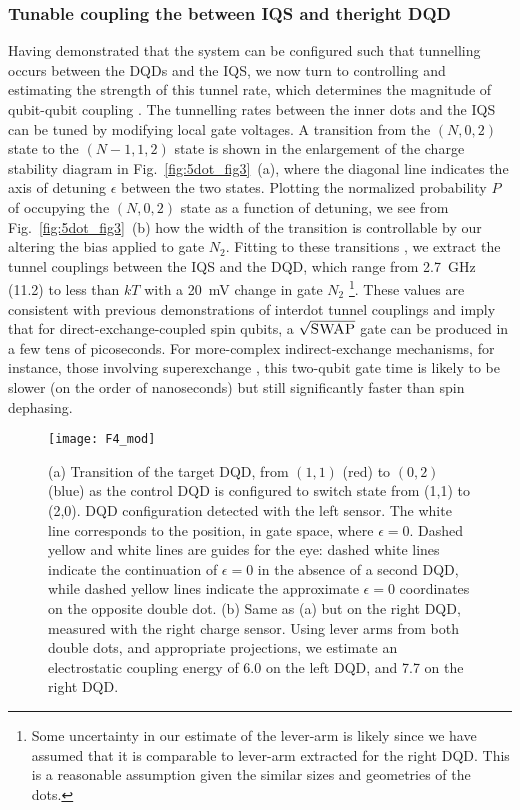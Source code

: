 \subsubsection{Tunable coupling the between IQS and theright DQD}
Having demonstrated that the system can be configured such that tunnelling occurs between the DQDs and the IQS, we now turn to controlling and estimating the strength of this tunnel rate, which determines the magnitude of qubit-qubit coupling \cite{bluhm,superexchange,srinivasa}. The tunnelling rates between the inner dots and the IQS can be tuned by modifying local gate voltages. A transition from the $(N,0,2)$ state to the $(N-1,1,2)$ state is shown in the enlargement of the charge stability diagram in Fig.~\ref{fig:5dot_fig3}~(a), where the diagonal line indicates the axis of detuning $\epsilon$ between the two states. Plotting the normalized probability $P$ of occupying the $(N,0,2)$ state as a function of detuning, we see from Fig.~\ref{fig:5dot_fig3}~(b) how the width of the transition is controllable by our altering the bias applied to gate $N_2$. Fitting to these transitions \cite{dicarlo}, we extract the tunnel couplings between the IQS and the DQD, which range from \SI{2.7}{\giga\hertz} (\SI{11.2}{\uev}) to less than $kT$ with a \SI{20}{\milli\volt} change in gate $N_2$ \footnote{Some uncertainty in our estimate of the lever-arm is likely since we have assumed that it is comparable to lever-arm extracted for the right DQD. This is a reasonable assumption given the similar sizes and geometries of the dots.}. These values are consistent with previous demonstrations of interdot tunnel couplings \cite{superexchange,petta} and imply that for direct-exchange-coupled spin qubits, a $\sqrt{\textsc{SWAP}}$ gate can be produced in a few tens of picoseconds. For more-complex indirect-exchange mechanisms, for instance, those involving superexchange \cite{bluhm,superexchange}, this two-qubit gate time is likely to be slower (on the order of nanoseconds) but still significantly faster than spin dephasing. 

\begin{figure}
\texttt{[image: F4\_mod]}
\caption[Capacative coupling between double quantum dots via an intermediate quantum state]{\label{fig:5dot_fig4} (a) Transition of the target DQD, from $(1,1)$ (red) to $(0,2)$ (blue) as the control DQD is configured to switch state from (1,1) to (2,0). DQD configuration detected with the left sensor. The white line corresponds to the position, in gate space, where $\epsilon = 0$. Dashed yellow and white lines are guides for the eye: dashed white lines indicate the continuation of $\epsilon = 0$ in the absence of a second DQD, while dashed yellow lines indicate the approximate $\epsilon = 0$ coordinates on the opposite double dot.  (b)  Same as (a) but on the right DQD, measured with the right charge sensor. Using lever arms from both double dots, and appropriate projections, we estimate an electrostatic coupling energy of \SI{6.0}{\uev} on the left DQD, and \SI{7.7}{\uev} on the right DQD.}
\end{figure}

